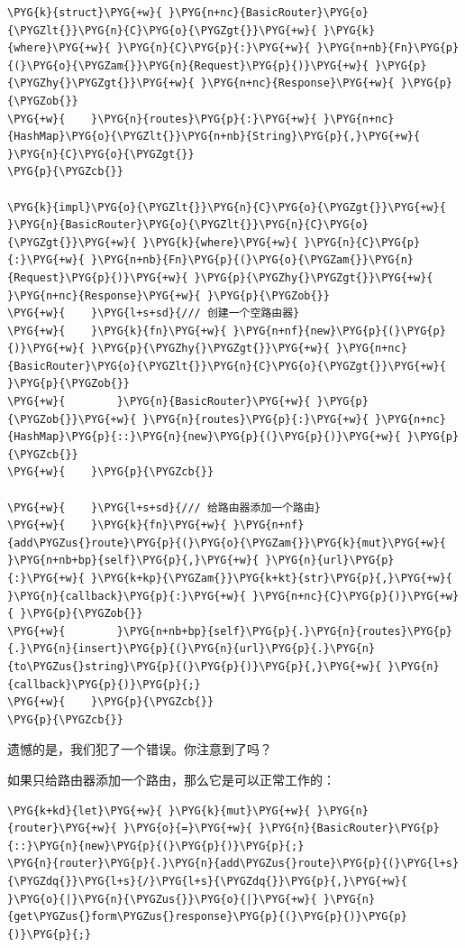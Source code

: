 \begin{Verbatim}[commandchars=\\\{\},breaklines=true,breakanywhere=true,fontsize=\codefont,xleftmargin=17bp]
\PYG{k}{struct}\PYG{+w}{ }\PYG{n+nc}{BasicRouter}\PYG{o}{\PYGZlt{}}\PYG{n}{C}\PYG{o}{\PYGZgt{}}\PYG{+w}{ }\PYG{k}{where}\PYG{+w}{ }\PYG{n}{C}\PYG{p}{:}\PYG{+w}{ }\PYG{n+nb}{Fn}\PYG{p}{(}\PYG{o}{\PYGZam{}}\PYG{n}{Request}\PYG{p}{)}\PYG{+w}{ }\PYG{p}{\PYGZhy{}\PYGZgt{}}\PYG{+w}{ }\PYG{n+nc}{Response}\PYG{+w}{ }\PYG{p}{\PYGZob{}}
\PYG{+w}{    }\PYG{n}{routes}\PYG{p}{:}\PYG{+w}{ }\PYG{n+nc}{HashMap}\PYG{o}{\PYGZlt{}}\PYG{n+nb}{String}\PYG{p}{,}\PYG{+w}{ }\PYG{n}{C}\PYG{o}{\PYGZgt{}}
\PYG{p}{\PYGZcb{}}

\PYG{k}{impl}\PYG{o}{\PYGZlt{}}\PYG{n}{C}\PYG{o}{\PYGZgt{}}\PYG{+w}{ }\PYG{n}{BasicRouter}\PYG{o}{\PYGZlt{}}\PYG{n}{C}\PYG{o}{\PYGZgt{}}\PYG{+w}{ }\PYG{k}{where}\PYG{+w}{ }\PYG{n}{C}\PYG{p}{:}\PYG{+w}{ }\PYG{n+nb}{Fn}\PYG{p}{(}\PYG{o}{\PYGZam{}}\PYG{n}{Request}\PYG{p}{)}\PYG{+w}{ }\PYG{p}{\PYGZhy{}\PYGZgt{}}\PYG{+w}{ }\PYG{n+nc}{Response}\PYG{+w}{ }\PYG{p}{\PYGZob{}}
\PYG{+w}{    }\PYG{l+s+sd}{/// 创建一个空路由器}
\PYG{+w}{    }\PYG{k}{fn}\PYG{+w}{ }\PYG{n+nf}{new}\PYG{p}{(}\PYG{p}{)}\PYG{+w}{ }\PYG{p}{\PYGZhy{}\PYGZgt{}}\PYG{+w}{ }\PYG{n+nc}{BasicRouter}\PYG{o}{\PYGZlt{}}\PYG{n}{C}\PYG{o}{\PYGZgt{}}\PYG{+w}{ }\PYG{p}{\PYGZob{}}
\PYG{+w}{        }\PYG{n}{BasicRouter}\PYG{+w}{ }\PYG{p}{\PYGZob{}}\PYG{+w}{ }\PYG{n}{routes}\PYG{p}{:}\PYG{+w}{ }\PYG{n+nc}{HashMap}\PYG{p}{::}\PYG{n}{new}\PYG{p}{(}\PYG{p}{)}\PYG{+w}{ }\PYG{p}{\PYGZcb{}}
\PYG{+w}{    }\PYG{p}{\PYGZcb{}}

\PYG{+w}{    }\PYG{l+s+sd}{/// 给路由器添加一个路由}
\PYG{+w}{    }\PYG{k}{fn}\PYG{+w}{ }\PYG{n+nf}{add\PYGZus{}route}\PYG{p}{(}\PYG{o}{\PYGZam{}}\PYG{k}{mut}\PYG{+w}{ }\PYG{n+nb+bp}{self}\PYG{p}{,}\PYG{+w}{ }\PYG{n}{url}\PYG{p}{:}\PYG{+w}{ }\PYG{k+kp}{\PYGZam{}}\PYG{k+kt}{str}\PYG{p}{,}\PYG{+w}{ }\PYG{n}{callback}\PYG{p}{:}\PYG{+w}{ }\PYG{n+nc}{C}\PYG{p}{)}\PYG{+w}{ }\PYG{p}{\PYGZob{}}
\PYG{+w}{        }\PYG{n+nb+bp}{self}\PYG{p}{.}\PYG{n}{routes}\PYG{p}{.}\PYG{n}{insert}\PYG{p}{(}\PYG{n}{url}\PYG{p}{.}\PYG{n}{to\PYGZus{}string}\PYG{p}{(}\PYG{p}{)}\PYG{p}{,}\PYG{+w}{ }\PYG{n}{callback}\PYG{p}{)}\PYG{p}{;}
\PYG{+w}{    }\PYG{p}{\PYGZcb{}}
\PYG{p}{\PYGZcb{}}
\end{Verbatim}

遗憾的是，我们犯了一个错误。你注意到了吗？

如果只给路由器添加一个路由，那么它是可以正常工作的：

\begin{Verbatim}[commandchars=\\\{\},breaklines=true,breakanywhere=true,fontsize=\codefont,xleftmargin=17bp]
\PYG{k+kd}{let}\PYG{+w}{ }\PYG{k}{mut}\PYG{+w}{ }\PYG{n}{router}\PYG{+w}{ }\PYG{o}{=}\PYG{+w}{ }\PYG{n}{BasicRouter}\PYG{p}{::}\PYG{n}{new}\PYG{p}{(}\PYG{p}{)}\PYG{p}{;}
\PYG{n}{router}\PYG{p}{.}\PYG{n}{add\PYGZus{}route}\PYG{p}{(}\PYG{l+s}{\PYGZdq{}}\PYG{l+s}{/}\PYG{l+s}{\PYGZdq{}}\PYG{p}{,}\PYG{+w}{ }\PYG{o}{|}\PYG{n}{\PYGZus{}}\PYG{o}{|}\PYG{+w}{ }\PYG{n}{get\PYGZus{}form\PYGZus{}response}\PYG{p}{(}\PYG{p}{)}\PYG{p}{)}\PYG{p}{;}
\end{Verbatim}

